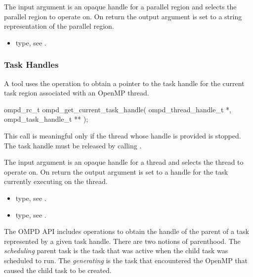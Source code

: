 \argdesc
The input argument  is an opaque handle for a parallel region and selects the parallel region to operate on.
On return the output argument  is set to a string representation of the parallel region.

\crossreferences
\begin{itemize}
	\item {} type, see .
\end{itemize}

\subsubsection{Task Handles}

\label{subsubsubsec:ompd_get_current_task_handle}
\summary
A tool uses the  operation to obtain a pointer to the 
task handle for the current task region associated with an OpenMP thread.

\format

\begin{cspecific}
\begin{ompSyntax}
ompd_rc_t ompd_get_current_task_handle(
  ompd_thread_handle_t *,
  ompd_task_handle_t **
);
\end{ompSyntax}
\end{cspecific}


\descr
This call is meaningful only if the thread whose handle is provided is stopped.
The task handle must be released by calling .

\argdesc
The input argument  is an opaque handle for a thread and selects the thread to operate on.
On return the output argument  is set to a handle for the task
currently executing on the thread.

\crossreferences
\begin{itemize}
	\item {} type, see .
	\item {} type, see .
\end{itemize}

The OMPD API includes operations to obtain the handle of the parent of a task represented by a 
given task handle. There are two notions of parenthood. The \emph{scheduling} parent task is the 
task that was active when the child task was scheduled to run. The \emph{generating} is the task 
that encountered the OpenMP that caused the child task to be created.

